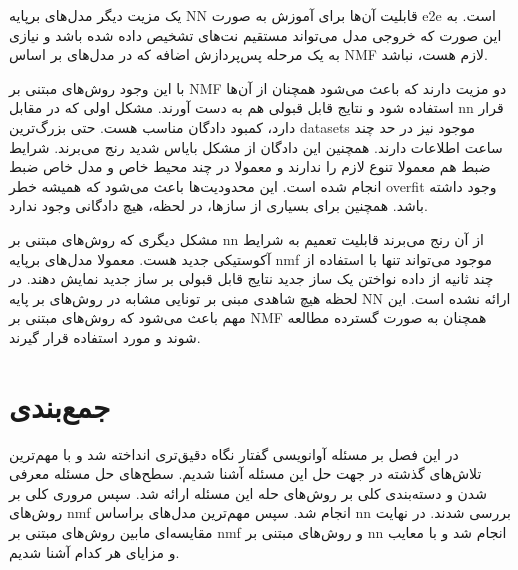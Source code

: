 یک مزیت دیگر مدل‌های برپایه \gls{NN} قابلیت آن‌ها برای آموزش به صورت \gls{e2e}
است. به این صورت که خروجی مدل می‌تواند مستقیم نت‌های تشخیص داده شده باشد و نیازی
به یک مرحله پس‌پردازش اضافه که در مدل‌های بر اساس \gls{NMF} لازم هست، نباشد.

با این وجود روش‌های مبتنی بر \gls{NMF} دو مزیت دارند که باعث می‌شود همچنان از
آن‌ها استفاده شود و نتایج قابل قبولی هم به دست آورند. مشکل اولی که در مقابل
\gls{nn} قرار دارد، کمبود دادگان مناسب هست. حتی بزرگ‌ترین \glspl{dataset} موجود
نیز در حد چند ساعت اطلاعات دارند. همچنین این دادگان از مشکل بایاس شدید رنج
می‌برند. شرایط ضبط هم معمولا تنوع لازم را ندارند و معمولا در چند محیط خاص و مدل
خاص ضبط انجام شده است. این محدودیت‌ها باعث می‌شود که همیشه خطر \gls{overfit}
وجود داشته باشد. همچنین برای بسیاری از سازها، در لحظه، هیچ دادگانی وجود ندارد.

مشکل دیگری که روش‌های مبتنی بر \gls{nn} از آن رنج می‌برند قابلیت تعمیم به شرایط
آکوستیکی جدید هست. معمولا مدل‌های برپایه \gls{nmf} موجود می‌تواند تنها با
استفاده از چند ثانیه از داده نواختن یک ساز جدید نتایج قابل قبولی بر ساز جدید
نمایش دهند. در لحظه هیچ شاهدی مبنی بر تونایی مشابه در روش‌های بر پایه \gls{NN}
ارائه نشده است. این مهم باعث می‌شود که روش‌های مبتنی بر \gls{NMF} همچنان به صورت
گسترده مطالعه شوند و مورد استفاده قرار گیرند.

\section{جمع‌بندی}
در این فصل بر مسئله آوانویسی گفتار نگاه دقیق‌تری انداخته شد و با مهم‌ترین
تلاش‌های گذشته در جهت حل این مسئله آشنا شدیم. سطح‌های حل مسئله معرفی شدن و
دسته‌بندی کلی بر روش‌های حله این مسئله ارائه شد. سپس مروری کلی بر روش‌های
\gls{nmf} انجام شد. سپس مهم‌ترین مدل‌های براساس \gls{nn} بررسی شدند. در نهایت
مقایسه‌ای مابین روش‌های مبتنی بر \gls{nmf} و روش‌های مبتنی بر \gls{nn} انجام شد
و با معایب و مزایای هر کدام آشنا شدیم.